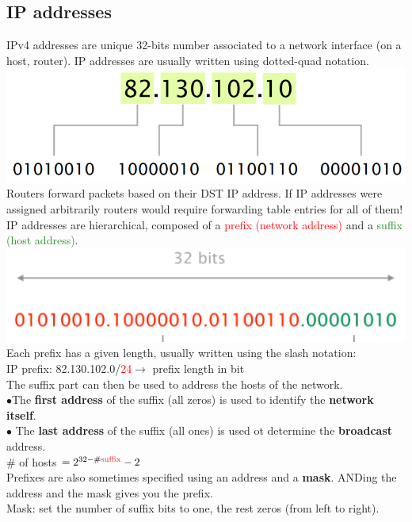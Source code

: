 \documentclass[a4paper, fontsize=8pt, landscape, DIV=1]{scrartcl}
\begin{document}
\begin{multicols*}{4}
   		\subsection{IP addresses}
   		IPv4 addresses are unique 32-bits number associated to a network interface (on a host, router). IP addresses are usually written using dotted-quad notation. 
   		\includegraphics[width=\columnwidth]{images/Network_Layer/IP_address.png}
   		Routers forward packets based on their DST IP address. If IP addresses were assigned arbitrarily routers would require forwarding table entries for all of them!\\
   		IP addresses are hierarchical, composed of a\textcolor{Red}{ prefix (network address)} and a \textcolor{ForestGreen}{suffix (host address)}. 
   		\includegraphics[width=\columnwidth]{images/Network_Layer/prefix_suffix.png}
   		Each prefix has a given length, usually written using the slash notation:\\
   		IP prefix: 82.130.102.0/\textcolor{Red}{24}$\rightarrow$ prefix length in bit\\
   		The suffix part can then be used to address the hosts of the network.\\
   		$\bullet$The \textbf{first address} of the suffix (all zeros) is used to identify the \textbf{network itself}.\\
   		$\bullet$ The \textbf{last address} of the suffix (all ones) is used ot determine the \textbf{broadcast} address.\\
   		\# of hosts $= 2^{32-\#\mathrm{\textcolor{Red}{suffix}}}-2$\\
   		Prefixes are also sometimes specified using an address and a \textbf{mask}. ANDing the address and the mask gives you the prefix. \\
   		Mask: set the number of suffix bits to one, the rest zeros (from left to right).\\

\end{multicols*}
\end{document}
